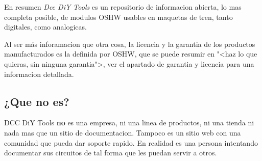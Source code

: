 En resumen \textit{Dcc DiY Tools} es un repositorio de informacion abierta, lo mas completa posible, de modulos OSHW usables
en maquetas de tren, tanto digitales, como analogicas.

Al ser más inforamacion que otra cosa, la licencia y la garantia de los productos manufacturados es la definida por OSHW, 
que se puede resumir en  "<haz lo que quieras, sin ninguna garantia">, ver el apartado de
garantia y licencia para una informacion detallada.

\subsection{¿Que no es?}
DCC DiY Tools \textbf{no} es una empresa, ni una linea de productos, ni una tienda ni nada mas que un sitio de documentacion. 
Tampoco es un sitio web con una comunidad que pueda dar soporte rapido.
En realidad es una persona intentando documentar sus circuitos de tal forma que les puedan servir a otros.